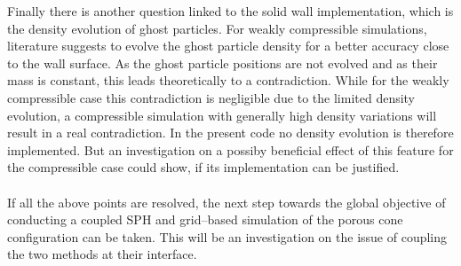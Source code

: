 \documentclass[11pt,a4paper,twoside]{report}
\begin{document}
Finally there is another question linked to the solid wall implementation, which is the density evolution of ghost particles. For weakly compressible simulations, literature suggests \cite{Morris1997,Zhu1999} to evolve the ghost particle density for a better accuracy close to the wall surface. As the ghost particle positions are not evolved and as their mass is constant, this leads theoretically to a contradiction. While for the weakly compressible case this contradiction is negligible due to the limited density evolution, a compressible simulation with generally high density variations will result in a real contradiction. In the present code no density evolution is therefore implemented. But an investigation on a possiby beneficial effect of this feature for the compressible case could show, if its implementation can be justified. \\
\\
\indent
If all the above points are resolved, the next step towards the global objective of conducting a coupled SPH and grid--based simulation of the porous cone configuration can be taken. This will be an investigation on the issue of coupling the two methods at their interface.








\end{document}
